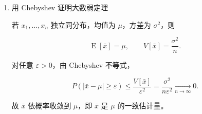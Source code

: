 \begin{question}
\begin{solution}
\begin{enumerate}
\[
P(|x-\mu|\ge a)\le \frac{\sigma^2}{a^2}.
\]

这就是 Chebyshev 不等式。

\item 用 Chebyshev 证明大数弱定理

若 \(x_1,\dots,x_n\) 独立同分布，均值为 \(\mu\)，方差为 \(\sigma^2\)，则

\[
\operatorname{E}[\bar x]=\mu,\qquad V[\bar x]=\frac{\sigma^2}{n}.
\]

对任意 \(\varepsilon>0\)，由 Chebyshev 不等式，

\[
P(|\bar x-\mu|\ge \varepsilon)
\le \frac{V[\bar x]}{\varepsilon^2}
=\frac{\sigma^2}{n\varepsilon^2}
\xrightarrow[n\to\infty]{}0.
\]

故 \(\bar x\) 依概率收敛到 \(\mu\)，即 \(\bar x\) 是 \(\mu\)
的一致估计量。
\end{enumerate}
\end{solution}
\end{question}


